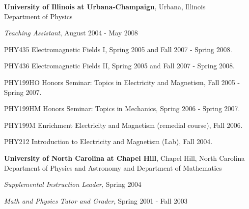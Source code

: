 {\bf University of Illinois at Urbana-Champaign}, Urbana, Illinois\\
Department of Physics
\vspace{1mm}
\begin{list1}
\item[] {\em Teaching Assistant}, August 2004 - May 2008

\begin{list2}
\item[\fcscore{3}] PHY435 Electromagnetic Fields I,  Spring 2005 and Fall 2007 - Spring 2008.
\item[\fcscore{4}] PHY436 Electromagnetic Fields II,  Spring 2005 and Fall 2007 - Spring 2008.
\item[\fcscore{4}] PHY199HO  Honors Seminar: Topics in Electricity and Magnetism, Fall 2005 - Spring 2007.
\item[\fcscore{3}] PHY199HM  Honors Seminar: Topics in Mechanics, Spring 2006 - Spring 2007.
\item[\fcscore{1}] PHY199M  Enrichment Electricity and Magnetism (remedial course), Fall 2006.
\item[\fcscore{1}] PHY212 Introduction to Electricity and Magnetism (Lab), Fall 2004.
\end{list2}

\end{list1}

{\bf University of North Carolina at Chapel Hill}, Chapel Hill, North Carolina\\
Department of Physics and Astronomy and Department of Mathematics
\begin{list1}
\vspace{1mm}
\item[] {\em Supplemental Instruction Leader}, Spring 2004

\vspace{1mm}
\item[] {\em Math and Physics Tutor and Grader}, Spring 2001 - Fall 2003
\end{list1}

